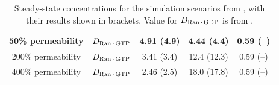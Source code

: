 \documentclass[12pt,notitlepage]{article}
\begin{document}
\begin{table}
\begin{tabular}{c|c|c|c|c}
	\hline
	50\% permeability
	&
	$D_{\ce{Ran . GTP}}$
	&
	4.91
	(4.9)
	& 
	4.44
	(4.4)
	&
	0.59 (--)
	\\
	\hline
	200\% permeability
	&
	$D_{\ce{Ran . GTP}}$
	&
	3.41
	(3.4)
	& 
	12.4
	(12.3)
	&
	0.59 (--)
	\\
	\hline
	400\% permeability
	&
	$D_{\ce{Ran . GTP}}$
	&
	2.46
	(2.5)
	& 
	18.0
	(17.8)
	&
	0.59 (--)
	\\
	\hline
\end{tabular}
\caption{%
	Steady-state concentrations
	for the simulation scenarios
	from \cite[Table~II/III]{GoerlichSeewaldRibbeck2003},
	with
	their results shown in brackets.
	Value for $D_{\ce{Ran . GDP}}$ is
	from \cite[Fig.~3]{GoerlichSeewaldRibbeck2003}.
}
\label{t:GSR-Ran-Runs}
\end{table}
\end{document}
